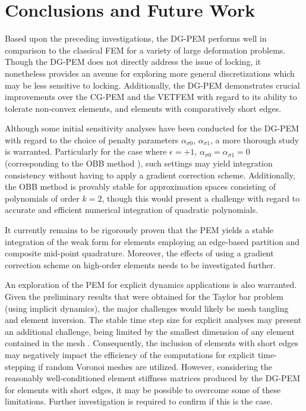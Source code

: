 \chapter{Conclusions and Future Work} \label{ch:future_work}
%
Based upon the preceding investigations, the DG-PEM performs well in comparison to the classical FEM for a variety of large deformation problems. Though the DG-PEM does not directly address the issue of locking, it nonetheless provides an avenue for exploring more general discretizations which may be less sensitive to locking. Additionally, the DG-PEM demonstrates crucial improvements over the CG-PEM and the VETFEM with regard to its ability to tolerate non-convex elements, and elements with comparatively short edges.

Although some initial sensitivity analyses have been conducted for the DG-PEM with regard to the choice of penalty parameters $\alpha_{\sigma0}$, $\alpha_{\sigma1}$, a more thorough study is warranted. Particularly for the case where $\epsilon = +1$, $\alpha_{\sigma0} = \alpha_{\sigma1} = 0$ (corresponding to the OBB method \cite{Oden:98}), such settings may yield integration consistency without having to apply a gradient correction scheme. Additionally, the OBB method is provably stable for approximation spaces consisting of polynomials of order $k=2$, though this would present a challenge with regard to accurate and efficient numerical integration of quadratic polynomials.

It currently remains to be rigorously proven that the PEM yields a stable integration of the weak form for elements employing an edge-based partition and composite mid-point quadrature. Moreover, the effects of using a gradient correction scheme on high-order elements needs to be investigated further.

An exploration of the PEM for explicit dynamics applications is also warranted. Given the preliminary results that were obtained for the Taylor bar problem (using implicit dynamics), the major challenges would likely be mesh tangling and element inversion. The stable time step size for explicit analyses may present an additional challenge, being limited by the smallest dimension of any element contained in the mesh \cite{Askes:15}. Consequently, the inclusion of elements with short edges may negatively impact the efficiency of the computations for explicit time-stepping if random Voronoi meshes are utilized. However, considering the reasonably well-conditioned element stiffness matrices produced by the DG-PEM for elements with short edges, it may be possible to overcome some of these limitations. Further investigation is required to confirm if this is the case.

